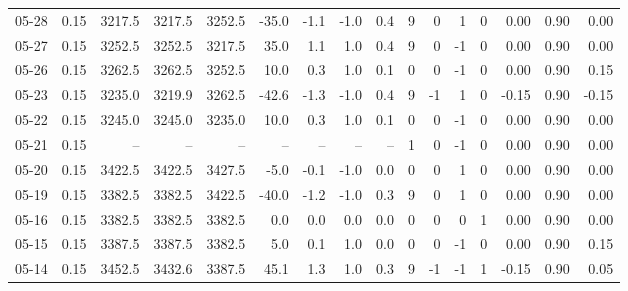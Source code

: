 \begin{threeparttable}
{\begin{tabular}{lrrrrrrrrrrrrrrr}
  05-28 &     0.15 & 3217.5 & 3217.5 & 3252.5 &      -35.0 &           -1.1 &                     -1.0 &                 0.4 &              9 &         0 &     1 &         0 &       0.00 &      0.90 &           0.00 \\
  05-27 &     0.15 & 3252.5 & 3252.5 & 3217.5 &       35.0 &            1.1 &                      1.0 &                 0.4 &              9 &         0 &    -1 &         0 &       0.00 &      0.90 &           0.00 \\
  05-26 &     0.15 & 3262.5 & 3262.5 & 3252.5 &       10.0 &            0.3 &                      1.0 &                 0.1 &              0 &         0 &    -1 &         0 &       0.00 &      0.90 &           0.15 \\
  05-23 &     0.15 & 3235.0 & 3219.9 & 3262.5 &      -42.6 &           -1.3 &                     -1.0 &                 0.4 &              9 &        -1 &     1 &         0 &      -0.15 &      0.90 &          -0.15 \\
  05-22 &     0.15 & 3245.0 & 3245.0 & 3235.0 &       10.0 &            0.3 &                      1.0 &                 0.1 &              0 &         0 &    -1 &         0 &       0.00 &      0.90 &           0.00 \\
  05-21 &     0.15 &     -- &     -- &     -- &         -- &             -- &                       -- &                  -- &              1 &         0 &    -1 &         0 &       0.00 &      0.90 &           0.00 \\
  05-20 &     0.15 & 3422.5 & 3422.5 & 3427.5 &       -5.0 &           -0.1 &                     -1.0 &                 0.0 &              0 &         0 &     1 &         0 &       0.00 &      0.90 &           0.00 \\
  05-19 &     0.15 & 3382.5 & 3382.5 & 3422.5 &      -40.0 &           -1.2 &                     -1.0 &                 0.3 &              9 &         0 &     1 &         0 &       0.00 &      0.90 &           0.00 \\
  05-16 &     0.15 & 3382.5 & 3382.5 & 3382.5 &        0.0 &            0.0 &                      0.0 &                 0.0 &              0 &         0 &     0 &         1 &       0.00 &      0.90 &           0.00 \\
  05-15 &     0.15 & 3387.5 & 3387.5 & 3382.5 &        5.0 &            0.1 &                      1.0 &                 0.0 &              0 &         0 &    -1 &         0 &       0.00 &      0.90 &           0.15 \\
  05-14 &     0.15 & 3452.5 & 3432.6 & 3387.5 &       45.1 &            1.3 &                      1.0 &                 0.3 &              9 &        -1 &    -1 &         1 &      -0.15 &      0.90 &           0.05 \\

\end{tabular}}
\end{threeparttable}
